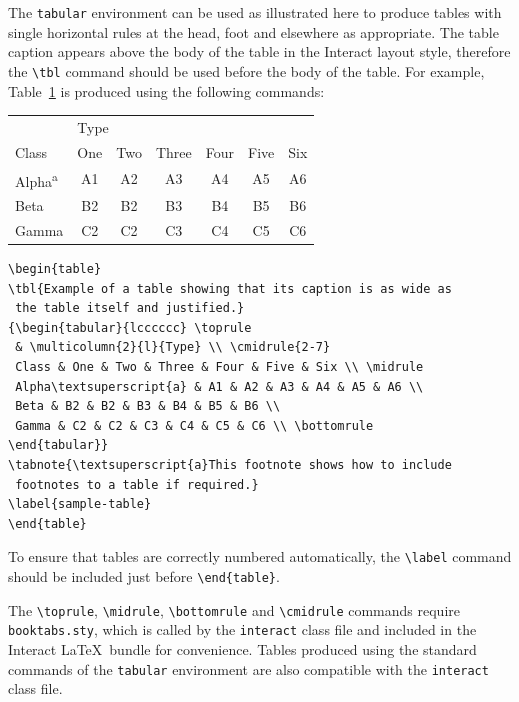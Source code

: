 \documentclass[]{interact}
\theoremstyle{plain}%
\theoremstyle{definition}
\theoremstyle{remark}
\begin{document}
The \texttt{tabular} environment can be used as illustrated here to produce tables with single horizontal rules at the head, foot and elsewhere as appropriate.
The table caption appears above the body of the table in the \textsf{Interact} layout style, therefore the \verb"\tbl" command should be used before the body of the table.
For example, Table~\ref{sample-table} is produced using the following commands:
\begin{table}
{\begin{tabular}{lcccccc} \toprule
 & \multicolumn{2}{l}{Type} \\ \cmidrule{2-7}
 Class & One & Two & Three & Four & Five & Six \\ \midrule
 Alpha\textsuperscript{a} & A1 & A2 & A3 & A4 & A5 & A6 \\
 Beta & B2 & B2 & B3 & B4 & B5 & B6 \\
 Gamma & C2 & C2 & C3 & C4 & C5 & C6 \\ \bottomrule
\end{tabular}}
\label{sample-table}
\end{table}
\begin{verbatim}
\begin{table}
\tbl{Example of a table showing that its caption is as wide as
 the table itself and justified.}
{\begin{tabular}{lcccccc} \toprule
 & \multicolumn{2}{l}{Type} \\ \cmidrule{2-7}
 Class & One & Two & Three & Four & Five & Six \\ \midrule
 Alpha\textsuperscript{a} & A1 & A2 & A3 & A4 & A5 & A6 \\
 Beta & B2 & B2 & B3 & B4 & B5 & B6 \\
 Gamma & C2 & C2 & C3 & C4 & C5 & C6 \\ \bottomrule
\end{tabular}}
\tabnote{\textsuperscript{a}This footnote shows how to include
 footnotes to a table if required.}
\label{sample-table}
\end{table}
\end{verbatim}

To ensure that tables are correctly numbered automatically, the \verb"\label" command should be included just before \verb"\end{table}".

The \verb"\toprule", \verb"\midrule", \verb"\bottomrule" and \verb"\cmidrule" commands require \verb"booktabs.sty", which is called by the \texttt{interact} class file and included in the \textsf{Interact} \LaTeX\ bundle for convenience. Tables produced using the standard commands of the \texttt{tabular} environment are also compatible with the \texttt{interact} class file.
\end{document}
